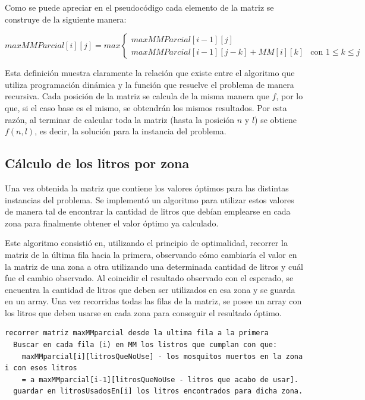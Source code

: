 \documentclass[a4paper,11pt] {article}
\begin{document}
Como se puede apreciar en el pseudoc\'odigo cada elemento de la matriz se construye de la siguiente manera:

$ maxMMParcial[i][j] = max \left\{ \begin{array}{ll}
         maxMMParcial[i-1][j] & \mbox{$$}\\
        maxMMParcial[i-1][j-k] + MM[i][k] & \mbox{con $1 \leq k \leq j$}\end{array} \right. $


Esta definici\'on muestra claramente la relaci\'on que existe entre el algoritmo que utiliza programaci\'on din\'amica y la funci\'on que resuelve el problema de manera recursiva. Cada posici\'on de la matriz se calcula de la misma manera que $f$, por lo que, si el caso base es el mismo, se obtendr\'an los mismos resultados. Por esta raz\'on, al terminar de calcular toda la matriz (hasta la posici\'on $n$ y $l$) se obtiene $f(n,l)$, es decir, la soluci\'on para la instancia del problema.

\subsection*{Cálculo de los litros por zona}

Una vez obtenida la matriz que contiene los valores óptimos para las distintas instancias del problema. Se implementó un algoritmo para utilizar estos valores de manera tal de encontrar la cantidad de litros que debían emplearse en cada zona para finalmente obtener el valor óptimo ya calculado.

Este algoritmo consistió en, utilizando el principio de optimalidad, recorrer la matriz de la última fila hacia la primera, observando cómo cambiaría el valor en la matriz de una zona a otra utilizando una determinada cantidad de litros y cuál fue el cambio observado. Al coincidir el resultado observado con el esperado, se encuentra la cantidad de litros que deben ser utilizados en esa zona y se guarda en un array. Una vez recorridas todas las filas de la matriz, se posee un array con los litros que deben usarse en cada zona para conseguir el resultado óptimo.

\begin{verbatim}
recorrer matriz maxMMparcial desde la ultima fila a la primera
  Buscar en cada fila (i) en MM los listros que cumplan con que:
    maxMMparcial[i][litrosQueNoUse] - los mosquitos muertos en la zona i con esos litros
    = a maxMMparcial[i-1][litrosQueNoUse - litros que acabo de usar].
  guardar en litrosUsadosEn[i] los litros encontrados para dicha zona.
\end{verbatim}
\end{document}
